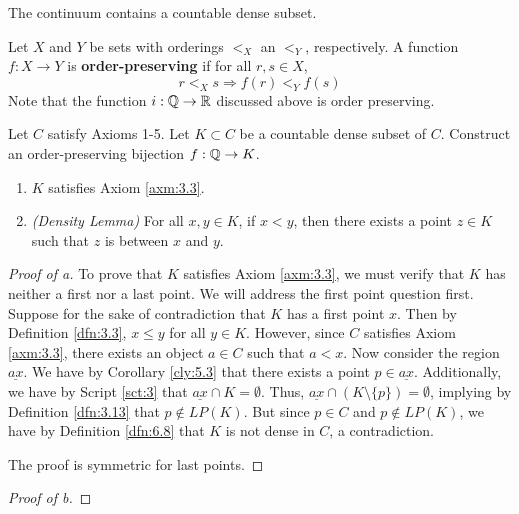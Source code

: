 \documentclass[../main.tex]{subfiles}
\begin{document}
\begin{axiom}\label{axm:6.5}
    The continuum contains a countable dense subset.
\end{axiom}

\begin{definition}\label{dfn:6.15}
    Let $X$ and $Y$ be sets with orderings $<_X$ an $<_Y$, respectively. A function $f:X\to Y$ is \textbf{order-preserving} if for all $r,s\in X$,
    \begin{equation*}
        r<_Xs \Longrightarrow f(r)<_Yf(s)
    \end{equation*}
    Note that the function $i:\mathbb{Q}\to\mathbb{R}$ discussed above is order preserving.
\end{definition}

\begin{exercise}\label{exr:6.16}
    Let $C$ satisfy Axioms 1-5. Let $K\subset C$ be a countable dense subset of $C$. Construct an order-preserving bijection $f:\mathbb{Q}\to K$.
    \begin{lemma*}\leavevmode
        \begin{enumerate}[label={\alph*\textup{)}}]
            \item $K$ satisfies Axiom \ref{axm:3.3}.
            \item \emph{(Density Lemma)} For all $x,y\in K$, if $x<y$, then there exists a point $z\in K$ such that $z$ is between $x$ and $y$.
        \end{enumerate}
        \begin{proof}[Proof of a]
            To prove that $K$ satisfies Axiom \ref{axm:3.3}, we must verify that $K$ has neither a first nor a last point. We will address the first point question first. Suppose for the sake of contradiction that $K$ has a first point $x$. Then by Definition \ref{dfn:3.3}, $x\leq y$ for all $y\in K$. However, since $C$ satisfies Axiom \ref{axm:3.3}, there exists an object $a\in C$ such that $a<x$. Now consider the region $\underline{ax}$. We have by Corollary \ref{cly:5.3} that there exists a point $p\in\underline{ax}$. Additionally, we have by Script \ref{sct:3} that $\underline{ax}\cap K=\emptyset$. Thus, $\underline{ax}\cap(K\setminus\{p\})=\emptyset$, implying by Definition \ref{dfn:3.13} that $p\notin LP(K)$. But since $p\in C$ and $p\notin LP(K)$, we have by Definition \ref{dfn:6.8} that $K$ is not dense in $C$, a contradiction.\par
            The proof is symmetric for last points.
        \end{proof}
        \begin{proof}[Proof of b]

\end{proof}
\end{lemma*}
\end{exercise}
\end{document}
